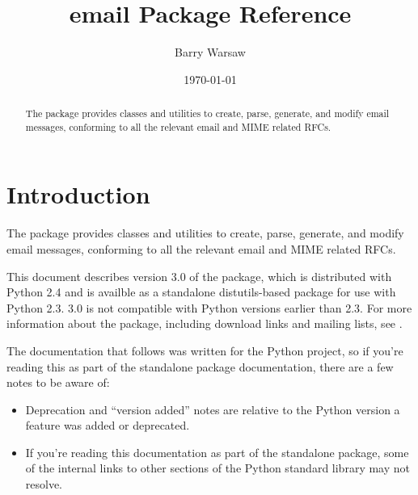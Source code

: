 \documentclass{howto}
\title{email Package Reference}
\author{Barry Warsaw}
\date{\today}
\begin{document}
\maketitle

\begin{abstract}
  The  package provides classes and utilities to create,
  parse, generate, and modify email messages, conforming to all the
  relevant email and MIME related RFCs.
\end{abstract}

%
\tableofcontents

\section{Introduction}
The  package provides classes and utilities to create,
parse, generate, and modify email messages, conforming to all the
relevant email and MIME related RFCs.

This document describes version 3.0 of the  package, which is
distributed with Python 2.4 and is availble as a standalone distutils-based
package for use with Python 2.3.   3.0 is not compatible with
Python versions earlier than 2.3.  For more information about the
 package, including download links and mailing lists, see
.

The documentation that follows was written for the Python project, so
if you're reading this as part of the standalone 
package documentation, there are a few notes to be aware of:

\begin{itemize}
\item Deprecation and ``version added'' notes are relative to the
      Python version a feature was added or deprecated.

\item If you're reading this documentation as part of the
      standalone  package, some of the internal links to
      other sections of the Python standard library may not resolve.

\end{itemize}


\end{document}
